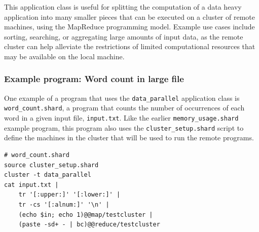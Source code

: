 \documentclass[twoside]{report}
\begin{document}
This application class is useful for splitting the computation of a data heavy application into many smaller pieces that can be executed on a cluster of remote machines, using the MapReduce programming model.
Example use cases include sorting, searching, or aggregating large amounts of input data, as the remote cluster can help alleviate the restrictions of limited computational resources that may be available on the local machine.

\subsubsection{Example program: Word count in large file}

\begin{sloppypar}
  One example of a program that uses the \texttt{data\_parallel} application class is \texttt{word\_count.shard}, a program that counts the number of occurrences of each word in a given input file, \texttt{input.txt}.
  Like the earlier \texttt{memory\_usage.shard} example program, this program also uses the \texttt{cluster\_setup.shard} script to define the machines in the cluster that will be used to run the remote programs.
\end{sloppypar}

\begin{minipage}[c]{\textwidth-15pt}
  \begin{lstlisting}[language=Shard]
# word_count.shard
source cluster_setup.shard
cluster -t data_parallel
cat input.txt |
    tr '[:upper:]' '[:lower:]' |
    tr -cs '[:alnum:]' '\n' |
    (echo $in; echo 1)@@map/testcluster |
    (paste -sd+ - | bc)@@reduce/testcluster
\end{lstlisting}
  \smallskip
\end{minipage}
\end{document}
